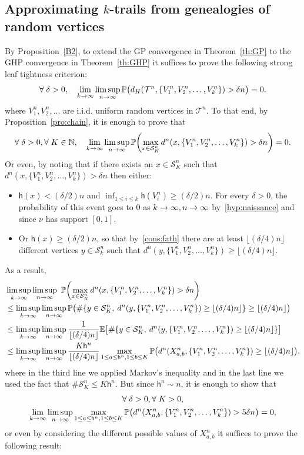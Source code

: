 \documentclass[10pt]{amsart}
\theoremstyle{definition}\newtheorem{defi}[theo]{Definition}\newtheorem{rema}[theo]{Remark}\newtheorem{exam}[theo]{Example}\newtheorem{exem}[theo]{Example}\newtheorem{nota}[theo]{Notation}
\newcommand{\proba}[1]{\mathbb{P}\left(#1\right)}
\newcommand{\N}{\mathbb{N}}
\newcommand{\E}{\mathbb{E}}
\newcommand{\1}{\mathbbm{1}}
\newcommand{\trail}{\mathcal{S}}
\newcommand{\T}{\mathcal{T}}
\newcommand{\h}{\mathsf{h}}
\let\originalleft\left
\let\originalright\right
\renewcommand{\left}{\mathopen{}\mathclose\bgroup\originalleft}
\renewcommand{\right}{\aftergroup\egroup\originalright}
\renewcommand*{\to}{\mathchoice{\longrightarrow}{\rightarrow}{\rightarrow}{\rightarrow}}
\let\oldforall\forall
\renewcommand*{\forall}{\mathrel{\oldforall}}
\begin{document}
\subsection{Approximating \texorpdfstring{$k$}{k}-trails from genealogies of random vertices}
By Proposition~\ref{B2}, to extend the GP convergence in Theorem~\ref{th:GP} to the GHP convergence in Theorem~\ref{th:GHP} it suffices to prove the following strong leaf tightness criterion:
\[
\forall \delta>0,\quad \lim_{k\to \infty} \limsup_{n\to \infty} \mathbb{P}\bigl(d_H(\T^n,\{V^n_1,V^n_2,\dots,V^n_k\})>\delta n \bigr) = 0.
\]
where $V^n_1,V^n_2,\dots$ are i.i.d. uniform random vertices in $\T^n$. To that end, by Proposition~\ref{pro:chain}, it is enough to prove that
\[
\forall \delta>0, \forall K\in \N, \quad \lim_{k\to \infty} \limsup_{n\to \infty} \proba{\max_{x\in \trail_K^n} d^n(x,\{V^n_1,V^n_2,\dots,V^n_k\})>\delta n} = 0.
\]
Or even, by noting that if there exists an $x\in \trail_K^n$ such that $d^n(x,\{V^n_1,V^n_2,\dots,V^n_k\})>\delta n$ then either:
\begin{itemize}
\item $\h(x)<(\delta/2)n$ and $\inf_{1\leq i \leq k} \h(V^n_i)\ge (\delta/2) n$. For every $\delta>0$, the probability of this event goes to $0$ as $k\to \infty,n\to \infty$ by~\ref{hyp:naissance} and since $\nu$ has support $[0,1]$.
\item Or $\h(x)\ge(\delta/2)n$, so that by~\ref{cons:fath} there are at least $\lfloor (\delta/4) n\rfloor$ different vertices $y\in \trail_k^n$ such that $d^n(y,\{V^n_1,V^n_2,\dots,V^n_k\})\ge \lfloor (\delta/4) n \rfloor$.
\end{itemize}
As a result,
\begin{align*}
&\limsup_{k\to \infty} \limsup_{n\to \infty} \ \proba{\max_{x\in \trail_K^n} d^n(x,\{V^n_1,V^n_2,\dots,V^n_k\})>\delta n}\\ &\le
\limsup_{k\to \infty} \limsup_{n\to \infty} \mathbb{P}\bigl( \# \left\{y \in \trail_K^n,\: d^n(y,\{V^n_1,V^n_2,\dots,V^n_k\})\ge\lfloor (\delta/4)n \rfloor \right\} \ge \lfloor (\delta/4)n \rfloor\bigr) \\
&\le \limsup_{k\to \infty} \limsup_{n\to \infty} \frac{1}{\lfloor (\delta/4)n \rfloor} \E\bigl[\# \{y \in \trail_K^n, \: d^n(y,\{V^n_1,V^n_2,\dots,V^n_k\})\ge\lfloor (\delta/4)n \rfloor \} \bigr] \\
&\le \limsup_{k\to \infty} \limsup_{n\to \infty} \frac{K \h^n}{\lfloor (\delta/4)n \rfloor} \max_{1\leq a\leq \h^n,1\leq b\leq K} \proba{d^n(X^n_{a,b},\{V^n_1,V^n_2,\dots,V^n_k\})\ge \lfloor (\delta/4) n\rfloor},
\end{align*}
where in the third line we applied Markov's inequality and in the last line we used the fact that $\#\trail_K^n \leq K \h^n$. But since $\h^n \sim n$, it is enough to show that
\begin{multline*}
\forall \delta>0, \forall K>0,  \\
\lim_{k\to \infty} \limsup_{n\to \infty} \max_{1\leq a\leq \h^n,1\leq b\leq K} \proba{d^n(X^n_{a,b},\{V^n_1,V^n_2,\dots,V^n_k\})>{5}\delta n} = 0,
\end{multline*}
or even by considering the different possible values of $X^n_{a,b}$ it suffices to prove the following result:
\end{document}
